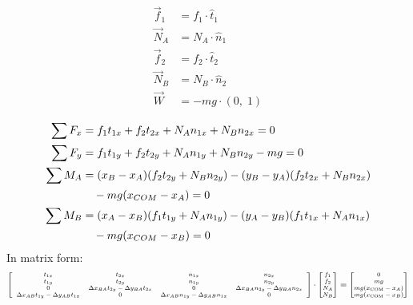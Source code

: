 \documentclass[11pt]{article}
\begin{document}
\begin{align*}
    \vec{f}_1 &= f_1 \cdot \hat{t}_1 \\
    \vec{N}_A &= N_A \cdot \hat{n}_1 \\
    \vec{f}_2 &= f_2 \cdot \hat{t}_2 \\
    \vec{N}_B &= N_B \cdot \hat{n}_2 \\
    \vec{W}   &= -mg \cdot (0,\; 1) \\
\end{align*}
\begin{align*}
    \sum F_x &= f_1 t_{1x} + f_2 t_{2x} + N_A n_{1x} + N_B n_{2x} = 0 \\
    \sum F_y &= f_1 t_{1y} + f_2 t_{2y} + N_A n_{1y} + N_B n_{2y} - mg = 0 \\
    \sum M_A &= 
    (x_B - x_A)(f_2 t_{2y} + N_B n_{2y}) - (y_B - y_A)(f_2 t_{2x} + N_B n_{2x}) \notag \\
    &\quad - mg (x_{COM} - x_A) = 0 \\
    \sum M_B &= 
    (x_A - x_B)(f_1 t_{1y} + N_A n_{1y}) - (y_A - y_B)(f_1 t_{1x} + N_A n_{1x}) \notag \\
    &\quad - mg (x_{COM} - x_B) = 0
\end{align*}
In matrix form: 
\begin{align*}
    \scriptsize
    \left[
    \begin{array}{cccc}
    t_{1x} & t_{2x} & n_{1x} & n_{2x} \\
    t_{1y} & t_{2y} & n_{1y} & n_{2y} \\
    0 & \Delta x_{BA} t_{2y} - \Delta y_{BA} t_{2x} 
      & 0 & \Delta x_{BA} n_{2y} - \Delta y_{BA} n_{2x} \\
    \Delta x_{AB} t_{1y} - \Delta y_{AB} t_{1x} 
      & 0 & \Delta x_{AB} n_{1y} - \Delta y_{AB} n_{1x} 
      & 0
    \end{array}
    \right]
    \cdot
    \begin{bmatrix}
    f_1 \\ f_2 \\ N_A \\ N_B
    \end{bmatrix}
    =
    \begin{bmatrix}
    0 \\
    mg \\
    mg (x_{\text{COM}} - x_A) \\
    mg (x_{\text{COM}} - x_B)
    \end{bmatrix}
    \normalsize
\end{align*}
    
\end{document}
